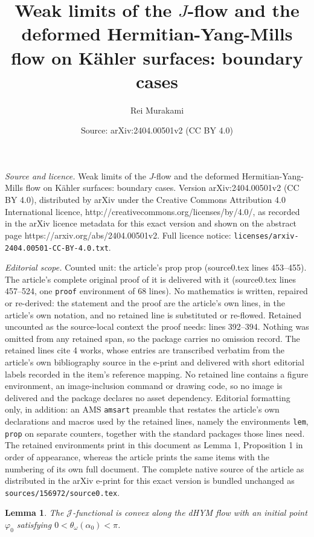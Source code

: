 \documentclass[10pt,a4paper]{amsart}
\title{Weak limits of the $J$-flow and the deformed Hermitian-Yang-Mills flow on K{\"a}hler surfaces: boundary cases}
\author{Rei Murakami}
\date{Source: arXiv:2404.00501v2 (CC BY 4.0)}
\newtheorem{lem}{Lemma}
\begin{document}
\maketitle

\noindent\emph{Source and licence.} Weak limits of the $J$-flow and the deformed Hermitian-Yang-Mills flow on K{\"a}hler surfaces: boundary cases. Version arXiv:2404.00501v2 (CC BY 4.0), distributed by arXiv under the Creative Commons Attribution 4.0 International licence, http://creativecommons.org/licenses/by/4.0/, as recorded in the arXiv licence metadata for this exact version and shown on the abstract page https://arxiv.org/abs/2404.00501v2. Full licence notice: \texttt{licenses/arxiv-2404.00501-CC-BY-4.0.txt}.\par\smallskip

\noindent\textit{Editorial scope.} Counted unit: the article's prop prop (source0.tex lines 453--455). The article's complete original proof of it is delivered with it (source0.tex lines 457--524, one \texttt{proof} environment of 68 lines). No mathematics is written, repaired or re-derived: the statement and the proof are the article's own lines, in the article's own notation, and no retained line is substituted or re-flowed.  Retained uncounted as the source-local context the proof needs: lines 392--394.  Nothing was omitted from any retained span, so the package carries no omission record.  The retained lines cite 4 works, whose entries are transcribed verbatim from the article's own bibliography source in the e-print and delivered with short editorial labels recorded in the item's reference mapping.  No retained line contains a figure environment, an image-inclusion command or drawing code, so no image is delivered and the package declares no asset dependency.  Editorial formatting only, in addition: an AMS \texttt{amsart} preamble that restates the article's own declarations and macros used by the retained lines, namely the environments \texttt{lem}, \texttt{prop} on separate counters, together with the standard packages those lines need.  The retained environments print in this document as Lemma 1, Proposition 1 in order of appearance, whereas the article prints the same items with the numbering of its own full document.  The complete native source of the article as distributed in the arXiv e-print for this exact version is bundled unchanged as \texttt{sources/156972/source0.tex}.
\begin{lem}\label{lemdhymconvexity}
    The $\mathcal{J}$-functional is convex along the dHYM flow with an initial point $\varphi_0$ satisfying $0<\theta_\omega(\alpha_0)<\pi$.
\end{lem}
\end{document}
